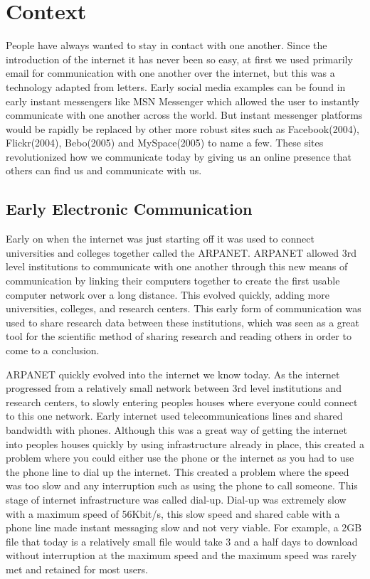 \chapter{Context} \label{context}
People have always wanted to stay in contact with one another. Since the introduction of the internet it has never been so easy, at first we used primarily email for communication with one another over the internet, but this was a technology adapted from letters. Early social media examples can be found in early instant messengers like MSN Messenger which allowed the user to instantly communicate with one another across the world. But instant messenger platforms would be rapidly be replaced by other more robust sites such as Facebook(2004), Flickr(2004), Bebo(2005) and MySpace(2005) to name a few. These sites revolutionized how we communicate today by giving us an online presence that others can find us and communicate with us.

\section{Early Electronic Communication}
Early on when the internet was just starting off it was used to connect universities and colleges together called the ARPANET. ARPANET allowed 3rd level institutions to communicate with one another through this new means of communication by linking their computers together to create the first usable computer network over a long distance. This evolved quickly, adding more universities, colleges, and research centers. This early form of communication was used to share research data between these institutions, which was seen as a great tool for the scientific method of sharing research and reading others in order to come to a conclusion.

ARPANET quickly evolved into the internet we know today. As the internet progressed from a relatively small network between 3rd level institutions and research centers, to slowly entering peoples houses where everyone could connect to this one network. Early internet used telecommunications lines and shared bandwidth with phones. Although this was a great way of getting the internet into peoples houses quickly by using infrastructure already in place, this created a problem where you could either use the phone or the internet as you had to use the phone line to dial up the internet. This created a problem where the speed was too slow and any interruption such as using the phone to call someone. This stage of internet infrastructure was called dial-up. Dial-up was extremely slow with a maximum speed of 56Kbit/s, this slow speed and shared cable with a phone line made instant messaging slow and not very viable. For example, a 2GB file that today is a relatively small file would take 3 and a half days to download without interruption at the maximum speed and the maximum speed was rarely met and retained for most users.


